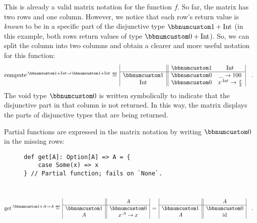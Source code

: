 \noindent This is already a valid matrix notation for the function
$f$. So far, the matrix has two rows and one column. However, we
notice that each row\textsf{'}s return value is \emph{known} to be in a specific
part of the disjunctive type $\bbnum 1+\text{Int}$ (in this example,
both rows return values of type $\bbnum 0+\text{Int}$). So, we can
split the column into two columns and obtain a clearer and more useful
notation for this function:
\[
\text{compute}^{:\bbnum 1+\text{Int}\rightarrow\bbnum 1+\text{Int}}\triangleq\,\begin{array}{|c||cc|}
 & \bbnum 1 & \text{Int}\\
\hline \bbnum 1 & \bbnum 0 & \_\rightarrow100\\
\text{Int} & \bbnum 0 & x^{:\text{Int}}\rightarrow\frac{x}{2}
\end{array}\quad.
\]
The void type $\bbnum 0$ is
written symbolically to indicate that the disjunctive part in that
column is not returned. In this way, the matrix displays the parts
of disjunctive types that are being returned. 

Partial functions are expressed in the matrix notation by writing
$\bbnum 0$ in the missing rows:

\begin{wrapfigure}{l}{0.45\columnwidth}%
\vspace{-0.65\baselineskip}
\begin{lstlisting}
def get[A]: Option[A] => A = {
    case Some(x) => x
} // Partial function; fails on `None`.
\end{lstlisting}

\vspace{-0.75\baselineskip}
\end{wrapfigure}%

~\vspace{-1.35\baselineskip}
\[
\text{get}^{:\bbnum 1+A\rightarrow A}\triangleq\,\begin{array}{|c||c|}
 & A\\
\hline \bbnum 1 & \bbnum 0\\
A & x^{:A}\rightarrow x
\end{array}\,=\,\begin{array}{|c||c|}
 & A\\
\hline \bbnum 1 & \bbnum 0\\
A & \text{id}
\end{array}\quad.
\]
\vspace{-0.9\baselineskip}

